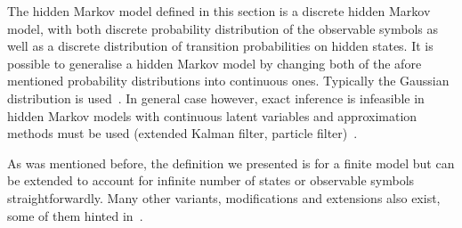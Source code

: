 The hidden Markov model defined in this section is a discrete hidden Markov model, with both discrete probability distribution of the observable symbols as well as a discrete distribution of transition probabilities on hidden states. It is possible to generalise a hidden Markov model by changing both of the afore mentioned probability distributions into continuous ones. Typically the Gaussian distribution is used~\cite{cappe2005, piyathilaka2013}. In general case however, exact inference is infeasible in hidden Markov models with continuous latent variables and approximation methods must be used (extended Kalman filter, particle filter)~\cite{cappe2005}.

As was mentioned before, the definition we presented is for a finite model but can be extended to account for infinite number of states or observable symbols straightforwardly. Many other variants, modifications and extensions also exist, some of them hinted in~\cite{Rabiner89hmm}.